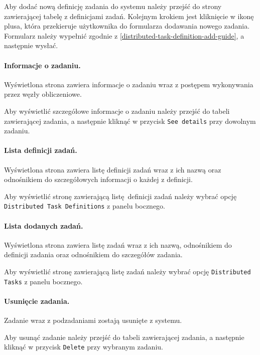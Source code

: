 \documentclass[a4paper,11pt,twoside]{report}
\theoremstyle{definition}
\begin{document}
                Aby dodać nową definicję zadania do systemu należy przejść do strony zawierającej tabelę z definicjami zadań. Kolejnym krokiem jest kliknięcie w ikonę plusa, która przekieruje użytkownika do formularza dodawania nowego zadania. Formularz należy wypełnić zgodnie z \ref{distributed-task-definition-add-guide}, a następnie wysłać.

            \paragraph{Informacje o zadaniu.}    
                \noindent Wyświetlona strona zawiera informacje o zadaniu wraz z postępem wykonywania przez węzły obliczeniowe. 
                
                Aby wyświetlić szczegółowe informacje o zadaniu należy przejść do tabeli zawierającej zadania, a następnie kliknąć w przycisk \texttt{See details} przy dowolnym zadaniu.
                
            \paragraph{Lista definicji zadań.}  
                \noindent Wyświetlona strona zawiera listę definicji zadań wraz z ich nazwą oraz odnośnikiem do szczegółowych informacji o każdej z definicji.

                Aby wyświetlić stronę zawierającą listę definicji zadań należy wybrać opcję \texttt{Distributed Task Definitions} z panelu bocznego.

            \paragraph{Lista dodanych zadań.}   
                \noindent Wyświetlona strona zawiera listę zadań wraz z ich nazwą, odnośnikiem do definicji zadania oraz odnośnikiem do szczegółów zadania.
                
                Aby wyświetlić stronę zawierającą listę zadań należy wybrać opcję \texttt{Distributed Tasks} z panelu bocznego.

            \paragraph{Usunięcie zadania.}  
                \noindent Zadanie wraz z podzadaniami zostają usunięte z systemu.
                
                Aby usunąć zadanie należy przejść do tabeli zawierającej zadania, a następnie kliknąć w przycisk \texttt{Delete} przy wybranym zadaniu.
\end{document}
